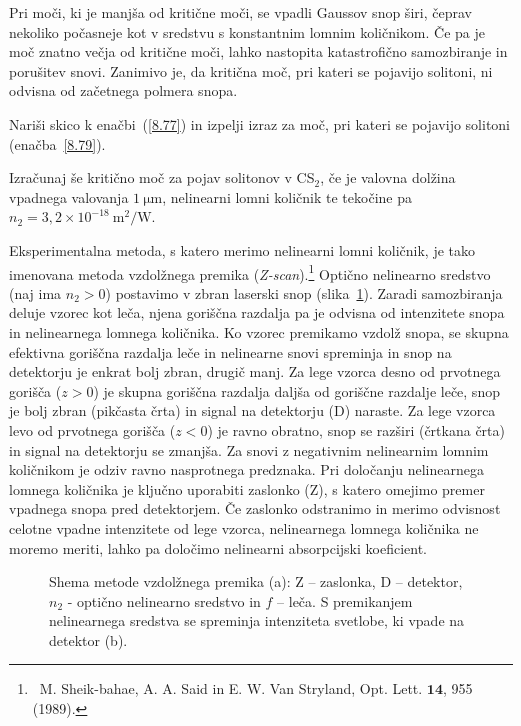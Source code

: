 Pri moči, ki je manjša od kritične moči, se vpadli Gaussov snop širi, 
čeprav nekoliko počasneje kot v sredstvu s konstantnim lomnim količnikom. 
Če pa je moč znatno večja od kritične moči, lahko
nastopita katastrofično samozbiranje in porušitev snovi.
Zanimivo je, da kritična moč, pri kateri se pojavijo solitoni, 
ni odvisna od začetnega polmera snopa.

\begin{definition}
Nariši skico k enačbi~(\ref{8.77}) in izpelji izraz za moč, pri kateri se pojavijo
solitoni (enačba~\ref{8.79}). 

Izračunaj še kritično moč za pojav solitonov v CS$_{2}$,
če je valovna dolžina vpadnega valovanja $1~\si{\micro\metre}$, 
nelinearni lomni količnik te tekočine pa 
 $n_{2}=3,2 \times 10^{-18}~\si{\metre^2/\watt}$. 
\end{definition}

\begin{remark}
Eksperimentalna metoda, 
s katero merimo nelinearni 
lomni količnik, je tako imenovana
metoda vzdolžnega premika ({\it Z-scan}).\footnote{~M. Sheik-bahae, A. A. Said in E. W. Van Stryland, 
Opt. Lett. $\mathbf{14}$, 955 (1989).} 
Optično nelinearno sredstvo (naj ima $n_2>0$)
postavimo v zbran laserski snop (slika~\ref{fig:zscan}). 
Zaradi samozbiranja deluje vzorec kot leča, njena goriščna razdalja
pa je odvisna od intenzitete snopa in nelinearnega lomnega količnika. Ko vzorec 
premikamo vzdolž snopa, se skupna efektivna goriščna razdalja leče in nelinearne snovi 
spreminja in snop na detektorju je enkrat bolj zbran, drugič manj. 
Za lege vzorca desno od prvotnega gorišča ($z>0$) je skupna goriščna
razdalja daljša od goriščne razdalje leče, snop je bolj zbran (pikčasta črta) in signal 
na detektorju (D) naraste. Za lege vzorca levo
od prvotnega gorišča ($z<0$) je ravno obratno, snop se razširi (črtkana črta) in 
signal na detektorju se zmanjša. Za snovi z negativnim nelinearnim lomnim količnikom
je odziv ravno nasprotnega predznaka. Pri določanju nelinearnega lomnega količnika je
ključno uporabiti zaslonko (Z), s katero omejimo premer vpadnega snopa pred detektorjem. 
Če zaslonko odstranimo in merimo 
odvisnost celotne vpadne intenzitete od lege vzorca, nelinearnega lomnega količnika 
ne moremo meriti, lahko pa določimo nelinearni absorpcijski koeficient. 

\begin{figure}[ht]
\centering 
\def\svgwidth{110truemm} 

\caption{Shema metode vzdolžnega premika (a): Z -- zaslonka, D -- detektor, $n_2$ - optično
nelinearno sredstvo in $f$ -- leča. S premikanjem nelinearnega sredstva se spreminja intenziteta svetlobe, 
ki vpade na detektor (b).}
\label{fig:zscan}
\end{figure}
\end{remark}

